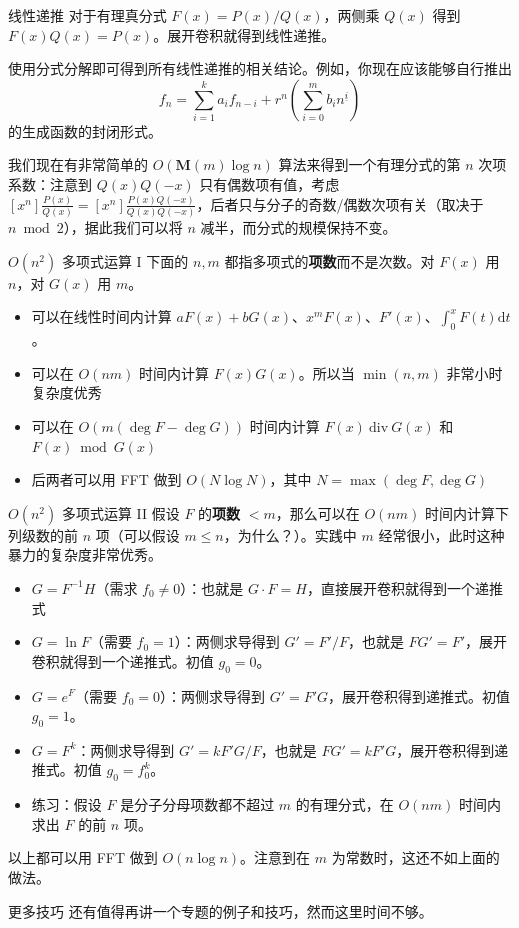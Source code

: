 \begin{frame}{线性递推}
    对于有理真分式 $F(x)=P(x)/Q(x)$，两侧乘 $Q(x)$ 得到 $F(x)Q(x)=P(x)$。展开卷积就得到线性递推。

    使用分式分解即可得到所有线性递推的相关结论。例如，你现在应该能够自行推出
    $$
    f_n=\sum_{i=1}^k a_if_{n-i}+r^n(\sum_{i=0}^m b_in^{\underline{i}})
    $$
    的生成函数的封闭形式。

    我们现在有非常简单的 $O(\mathbf{M}(m)\log n)$ 算法来得到一个有理分式的第 $n$ 次项系数：注意到 $Q(x)Q(-x)$ 只有偶数项有值，考虑 $[x^n]\frac{P(x)}{Q(x)}=[x^n]\frac{P(x)Q(-x)}{Q(x)Q(-x)}$，后者只与分子的奇数/偶数次项有关（取决于 $n\bmod 2$），据此我们可以将 $n$ 减半，而分式的规模保持不变。
\end{frame}
\begin{frame}{$O(n^2)$ 多项式运算 I}
    下面的 $n,m$ 都指多项式的\textbf{项数}而不是次数。对 $F(x)$ 用 $n$，对 $G(x)$ 用 $m$。 
    \begin{itemize}
        \item  可以在线性时间内计算 $aF(x)+bG(x)$、$x^mF(x)$、$F'(x)$、$\int_0^x F(t)\mathrm{d}t$。
        \item 可以在 $O(nm)$ 时间内计算 $F(x)G(x)$。所以当 $\min(n,m)$ 非常小时复杂度优秀
        \item 可以在 $O(m(\deg F-\deg G))$ 时间内计算 $F(x)\ \mathrm{div}\  G(x)$ 和 $F(x)\bmod G(x)$
        \item 后两者可以用 FFT 做到 $O(N\log N)$，其中 $N=\max(\deg F,\deg G)$
    \end{itemize}
\end{frame}
\begin{frame}{$O(n^2)$ 多项式运算 II}
    假设 $F$ 的\textbf{项数} $<m$，那么可以在 $O(nm)$ 时间内计算下列级数的前 $n$ 项（可以假设 $m\le n$，为什么？）。实践中 $m$ 经常很小，此时这种暴力的复杂度非常优秀。
    \begin{itemize}
        \item $G=F^{-1}H$（需求 $f_0\ne 0$）：也就是 $G\cdot F=H$，直接展开卷积就得到一个递推式
        \item $G=\ln F$（需要 $f_0=1$）：两侧求导得到 $G'=F'/F$，也就是 $FG'=F'$，展开卷积就得到一个递推式。初值 $g_0=0$。
        \item $G=e^F$（需要 $f_0=0$）：两侧求导得到 $G'=F'G$，展开卷积得到递推式。初值 $g_0=1$。
        \item $G=F^k$：两侧求导得到 $G'=kF'G/F$，也就是 $FG'=kF'G$，展开卷积得到递推式。初值 $g_0=f_0^k$。
        \item 练习：假设 $F$ 是分子分母项数都不超过 $m$ 的有理分式，在 $O(nm)$ 时间内求出 $F$ 的前 $n$ 项。
    \end{itemize}

    以上都可以用 FFT 做到 $O(n\log n)$。注意到在 $m$ 为常数时，这还不如上面的做法。
\end{frame}
\begin{frame}{更多技巧}
    还有值得再讲一个专题的例子和技巧，然而这里时间不够。
\end{frame}
